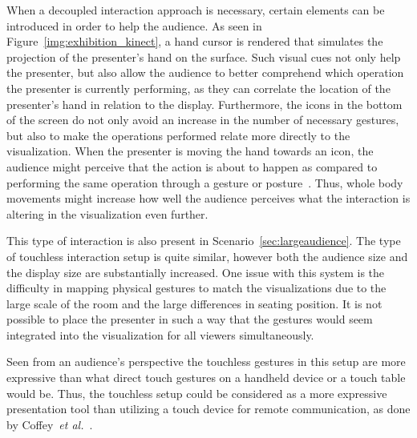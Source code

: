 \documentclass[journal]{vgtc}                %
\newcommand{\todo}[1]{\textbf{\textcolor{red}{[TODO: {#1}]}}}
\begin{document}
When a decoupled interaction approach is necessary, certain elements can be introduced in order to help the audience.
As seen in Figure~\ref{img:exhibition_kinect}, a hand cursor is rendered that simulates the projection of the presenter's hand on the surface.
Such visual cues not only help the presenter, but also allow the audience to better comprehend which operation the presenter is currently performing, as they can correlate the location of the presenter's hand in relation to the display.
Furthermore, the icons in the bottom of the screen do not only avoid an increase in the number of necessary gestures, but also to make the operations performed relate more directly to the visualization. 
When the presenter is moving the hand towards an icon, the audience might perceive that the action is about to happen as compared to performing the same operation through a gesture or posture~\cite{isenberg:hal-00781237}. 
Thus, whole body movements \cite{978-0-85729-432-6, Shoemaker:2010:BIT:1868914.1868967} might increase how well the audience perceives what the interaction is altering in the visualization even further.

This type of interaction is also present in Scenario~\ref{sec:largeaudience}. The type of touchless interaction setup is quite similar, however both the audience size and the display size are substantially increased.
One issue with this system is the difficulty in mapping physical gestures to match the visualizations due to the large scale of the room and the large differences in seating position.
It is not possible to place the presenter in such a way that the gestures would seem integrated into the visualization for all viewers simultaneously.

Seen from an audience's perspective the touchless gestures in this setup are more expressive than what direct touch gestures on a handheld device or a touch table would be.
Thus, the touchless setup could be considered as a more expressive presentation tool than utilizing a touch device for remote communication, as done by Coffey~\textit{et al.}~\cite{Coffey:2012:ISW:2360744.2360843}.




\end{document}
